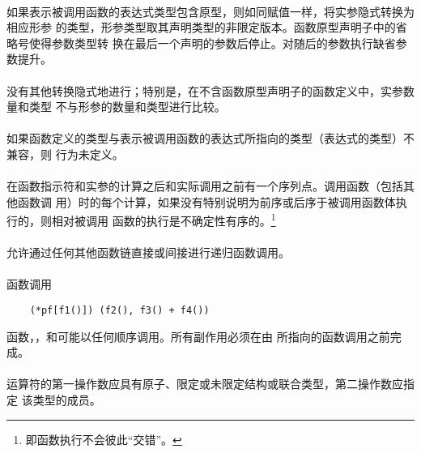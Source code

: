 {\paragraph{}
如果表示被调用函数的表达式类型包含原型，则如同赋值一样，将实参隐式转换为相应形参
的类型，形参类型取其声明类型的非限定版本。函数原型声明子中的省略号使得参数类型转
换在最后一个声明的参数后停止。对随后的参数执行缺省参数提升。

\paragraph{}
没有其他转换隐式地进行；特别是，在不含函数原型声明子的函数定义中，实参数量和类型
不与形参的数量和类型进行比较。

\paragraph{}
如果函数定义的类型与表示被调用函数的表达式所指向的类型（表达式的类型）不兼容，则
行为未定义。

\paragraph{}
在函数指示符和实参的计算之后和实际调用之前有一个序列点。调用函数（包括其他函数调
用）时的每个计算，如果没有特别说明为前序或后序于被调用函数体执行的，则相对被调用
函数的执行是不确定性有序的。\footnote{即函数执行不会彼此``交错''。}

\paragraph{}
允许通过任何其他函数链直接或间接进行递归函数调用。

\paragraph{}
\ex* 函数调用
\begin{lstlisting}
    (*pf[f1()]) (f2(), f3() + f4())
\end{lstlisting}
函数，，和可能以任何顺序调用。所有副作用必须在由
所指向的函数调用之前完成。


\constraint
\paragraph{}
运算符的第一操作数应具有原子、限定或未限定结构或联合类型，第二操作数应指定
该类型的成员。

}

